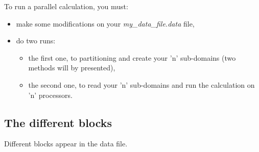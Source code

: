 To run a parallel calculation, you must:
\begin{itemize}
\item make some modifications on your \textit{my\_data\_file.data} file,
\item do two runs:
    \begin{itemize}
    \item the first one, to partitioning and create your 'n' sub-domains (two methods will by presented),
    \item the second one, to read your 'n' sub-domains and run the calculation on 'n' processors.
    \end{itemize}
\end{itemize}



\subsection{The different blocks} \label{decjdd}
Different blocks appear in the data file.

